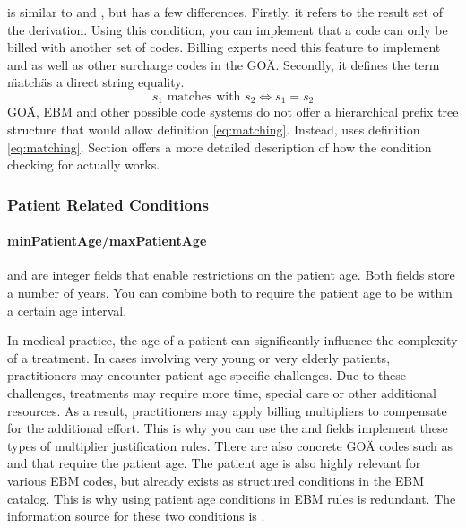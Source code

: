  is similar to  and , but has a few differences.
Firstly, it refers to the result set of the derivation.
Using this condition, you can implement that a code can only be billed with another set of codes.
Billing experts need this feature to implement  and  as well as other surcharge codes in the GOÄ.
Secondly, it defines the term \"match\" as a direct string equality.
\begin{equation}\label{eq:matching-string-equals}
s_1 \text{ matches with } s_2 \iff s_1 = s_2
\end{equation}
GOÄ, EBM and other possible code systems do not offer a hierarchical prefix tree structure that would allow definition \ref{eq:matching}.
Instead,  uses definition \ref{eq:matching}.
Section \addref offers a more detailed description of how the condition checking for  actually works.

\subsubsection{Patient Related Conditions}

\paragraph{minPatientAge/maxPatientAge}
 and  are integer fields that enable restrictions on the patient age.
Both fields store a number of years.
You can combine both to require the patient age to be within a certain age interval.

In medical practice, the age of a patient can significantly influence the complexity of a treatment.
In cases involving very young or very elderly patients, practitioners may encounter patient age specific challenges.
Due to these challenges, treatments may require more time, special care or other additional resources.
As a result, practitioners may apply billing multipliers to compensate for the additional effort.
This is why you can use the  and  fields implement these types of multiplier justification rules.
There are also concrete GOÄ codes such as  and  that require the patient age.
The patient age is also highly relevant for various EBM codes, but already exists as structured conditions in the EBM catalog.
This is why using patient age conditions in EBM rules is redundant.
The information source for these two conditions is .

